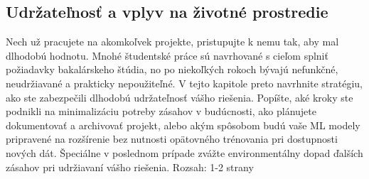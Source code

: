 \subsection{Udržateľnosť a vplyv na životné prostredie}
Nech už pracujete na akomkoľvek projekte, pristupujte k nemu tak, aby mal dlhodobú hodnotu. Mnohé študentské práce sú navrhované s cieľom splniť požiadavky bakalárskeho štúdia, no po niekoľkých rokoch bývajú nefunkčné, neudržiavané a prakticky nepoužiteľné. V tejto kapitole preto navrhnite stratégiu, ako ste zabezpečili dlhodobú udržateľnosť vášho riešenia. Popíšte, aké kroky ste podnikli na minimalizáciu potreby zásahov v budúcnosti, ako plánujete dokumentovať a archivovať projekt, alebo akým spôsobom budú vaše ML modely pripravené na rozšírenie bez nutnosti opätovného trénovania pri dostupnosti nových dát. Špeciálne v poslednom prípade zvážte environmentálny dopad ďalších zásahov pri udržiavaní vášho riešenia. Rozsah: 1-2 strany